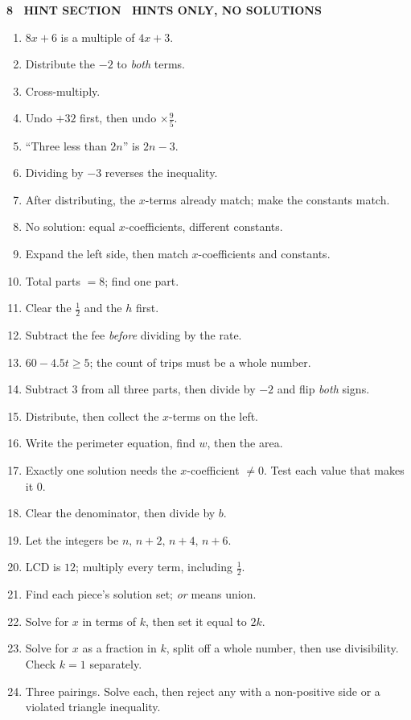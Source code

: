 \documentclass[10pt]{article}
\newcommand{\banner}[1]{\vspace{6pt}\par\noindent\begin{tcolorbox}[enhanced,colback=NAVY,colframe=NAVY,boxrule=0pt,arc=2pt,left=6pt,top=1pt,bottom=1pt,nobeforeafter]\color{white}\bfseries\small\MakeUppercase{#1}\end{tcolorbox}\par\nopagebreak\vspace{2pt}}
\begin{document}
\newpage\banner{8 \textperiodcentered\ Hint Section \textemdash\ hints only, no solutions}
\begin{enumerate}[leftmargin=1.6em,itemsep=1.5pt,label=\textbf{\arabic*.}]
\item $8x+6$ is a multiple of $4x+3$.
\item Distribute the $-2$ to \emph{both} terms.
\item Cross-multiply.
\item Undo $+32$ first, then undo $\times\frac95$.
\item ``Three less than $2n$'' is $2n-3$.
\item Dividing by $-3$ reverses the inequality.
\item After distributing, the $x$-terms already match; make the constants match.
\item No solution: equal $x$-coefficients, different constants.
\item Expand the left side, then match $x$-coefficients and constants.
\item Total parts $=8$; find one part.
\item Clear the $\frac12$ and the $h$ first.
\item Subtract the fee \emph{before} dividing by the rate.
\item $60-4.5t\ge5$; the count of trips must be a whole number.
\item Subtract $3$ from all three parts, then divide by $-2$ and flip \emph{both} signs.
\item Distribute, then collect the $x$-terms on the left.
\item Write the perimeter equation, find $w$, then the area.
\item Exactly one solution needs the $x$-coefficient $\ne0$. Test each value that makes it $0$.
\item Clear the denominator, then divide by $b$.
\item Let the integers be $n,\,n+2,\,n+4,\,n+6$.
\item LCD is $12$; multiply every term, including $\frac12$.
\item Find each piece's solution set; \emph{or} means union.
\item Solve for $x$ in terms of $k$, then set it equal to $2k$.
\item Solve for $x$ as a fraction in $k$, split off a whole number, then use divisibility. Check $k=1$ separately.
\item Three pairings. Solve each, then reject any with a non-positive side or a violated triangle inequality.
\end{enumerate}
\end{document}
